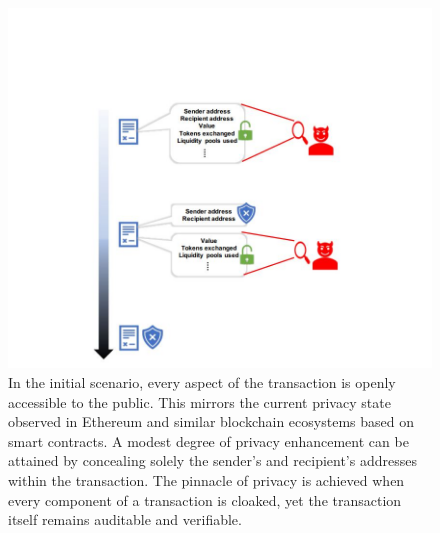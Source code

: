 \begin{center}
	\begin{figure}
		\centering
		\includegraphics[width=0.8\linewidth]{Fig/20/F4}
		\caption{In the initial scenario, every aspect of the transaction is openly accessible to the public. This mirrors the current privacy state observed in Ethereum and similar blockchain ecosystems based on smart contracts. A modest degree of privacy enhancement can be attained by concealing solely the sender's and recipient's addresses within the transaction. The pinnacle of privacy is achieved when every component of a transaction is cloaked, yet the transaction itself remains auditable and verifiable.
		}
		\label{fig:L20_f4}
	\end{figure}
\end{center}
